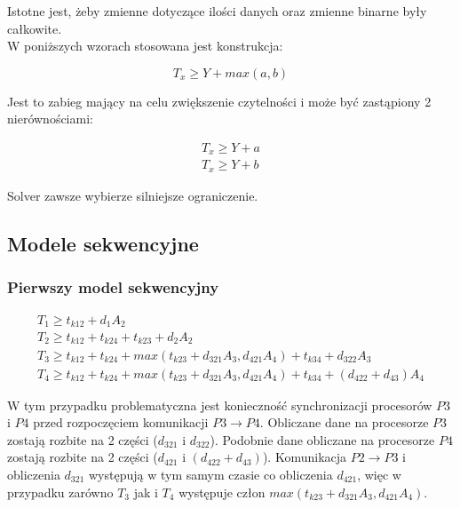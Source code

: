 Istotne jest, żeby zmienne dotyczące ilości danych oraz zmienne binarne były całkowite. \\

W poniższych wzorach stosowana jest konstrukcja:

\begin{equation} \label{eq:max1}
T_{x} \geq Y + max(a, b)
\end{equation}

Jest to zabieg mający na celu zwiększenie czytelności i może być zastąpiony 2 nierównościami:

\begin{equation} \label{eq:max2}
\begin{array}{l}
T_{x} \geq Y + a \\
T_{x} \geq Y + b
\end{array}
\end{equation}

Solver zawsze wybierze silniejsze ograniczenie.

\subsection{Modele sekwencyjne}

\subsubsection{Pierwszy model sekwencyjny}

\begin{equation} \label{eq:sek1}
\begin{array}{l}
T_{1} \geq t_{k12} + d_{1}A_{2} \\
T_{2} \geq t_{k12} + t_{k24} + t_{k23} + d_{2}A_{2} \\
T_{3} \geq t_{k12} + t_{k24} + max(t_{k23} + d_{321}A_{3}, d_{421}A_{4}) + t_{k34} + d_{322}A_{3} \\
T_{4} \geq t_{k12} + t_{k24} + max(t_{k23} + d_{321}A_{3}, d_{421}A_{4}) + t_{k34} + (d_{422} + d_{43})A_{4}
\end{array} 
\end{equation}

W tym przypadku problematyczna jest konieczność synchronizacji procesorów $P3$ i $P4$ przed rozpoczęciem komunikacji $P3 \to P4$.
Obliczane dane na procesorze $P3$ zostają rozbite na 2 części ($d_{321}$ i $d_{322}$).
Podobnie dane obliczane na procesorze $P4$ zostają rozbite na 2 części ($d_{421}$ i $(d_{422} + d_{43})$).
Komunikacja $P2 \to P3$ i obliczenia $d_{321}$ występują w tym samym czasie co obliczenia $d_{421}$,
więc w przypadku zarówno $T_{3}$ jak i $T_{4}$ występuje człon $max(t_{k23} + d_{321}A_{3}, d_{421}A_{4})$. \\

